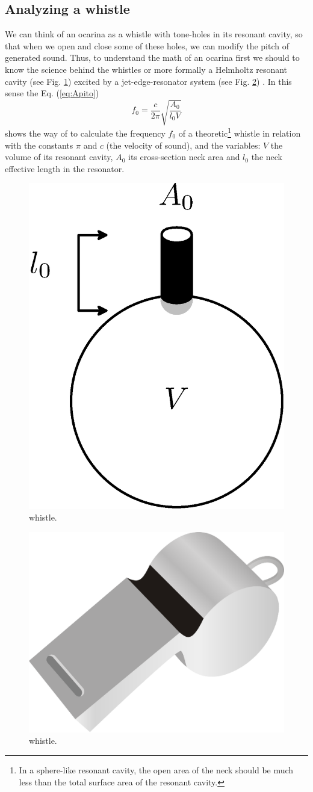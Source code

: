 \documentclass[11pt,twocolumn]{article}
\begin{document}
\subsection{Analyzing a whistle}
We can think of an ocarina as a whistle with tone-holes in its resonant cavity,
so that when we open and close some of these holes, we can modify the pitch of generated sound.
Thus, to understand the math of an ocarina first we should to know the science behind the whistles  
or more formally a Helmholtz resonant cavity \citep{corning2011resonance} (see Fig. \ref{fig:resonador}) excited by a jet-edge-resonator system (see Fig. \ref{football-referee-whistle}) \citep[pp. 3]{gibiat2013acoustic} \citep[pp. 138]{nyborg1953characteristics}. 
In this sense the Eq. (\ref{eq:Apito}) 
\begin{equation} 
\label{eq:Apito}
 f_0 = \frac{c}{2 \pi} \sqrt{\frac{A_{0}}{l_{0}V} }  
\end{equation}
shows the way of to calculate the frequency $f_0$ of a theoretic\footnote{In  a sphere-like resonant cavity, the open area of the neck should be much less than the total surface area of the resonant cavity.} whistle \citep[pp. 3]{gibiat2013acoustic} \citep[pp. 5]{kobayashi20093d} \citep[pp. 265]{okadanumerical}
in relation with the constants $\pi$  and $c$ (the velocity of sound), and 
the variables: $V$ the volume of its resonant cavity,
$A_0$ its cross-section neck area and $l_0$ the neck effective length in the resonator.


\begin{figure}[ht!]
\centering
\includegraphics[width=0.350\columnwidth]{resonador.eps}
\caption{whistle. }
\label{fig:resonador}
\end{figure}

\begin{figure}[ht!]
\centering
\includegraphics[width=0.250\columnwidth]{football-referee-whistle.eps}
\caption{whistle. }
\label{football-referee-whistle}
\end{figure}
\end{document}

